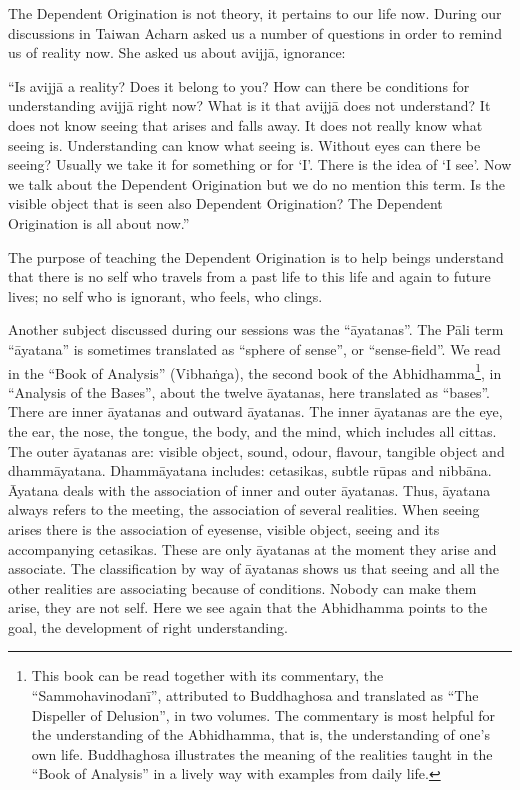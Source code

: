 \documentclass{book}
\begin{document}
The Dependent Origination is not theory, it
pertains to our life now. During our discussions in Taiwan Acharn asked
us a number of questions in order to remind us of reality now. She asked
us about avijjā, ignorance: 

``Is avijjā a reality? Does it belong to
you? How can there be conditions for understanding
avijjā right now? What is it that
avijjā does not understand? It does not know
seeing that arises and falls away. It does not really know what seeing
is. Understanding can know what seeing is. Without eyes can there be
seeing? Usually we take it for something or for `I'. There is the idea
of `I see'. Now we talk about the Dependent Origination but we do no
mention this term. Is the visible object that is seen also Dependent
Origination? The Dependent Origination is all about now.''

The purpose of teaching the Dependent
Origination is to help beings understand that there is no self who
travels from a past life to this life and again to future lives; no self
who is ignorant, who feels, who clings.

Another subject discussed during our
sessions was the ``āyatanas''. The
Pāli term
``āyatana'' is sometimes translated as
``sphere of
sense'', or ``sense-field''.
We read in the ``Book of Analysis''
(Vibhaṅga), the second book
of the Abhidhamma\footnote{This book can be read together with its
commentary, the
``Sammohavinodanī'',
attributed to Buddhaghosa and translated as
``The Dispeller of
Delusion'', in two volumes. The
commentary is most helpful for the understanding of the Abhidhamma, that
is, the understanding of one's own life.
Buddhaghosa illustrates the meaning of the realities taught in the
``Book of Analysis''
in a lively way with examples from daily
life. },
in ``Analysis of the
Bases'', about the twelve
āyatanas, here translated
as ``bases''. There are
inner āyatanas and outward
āyatanas. The inner
āyatanas are
the eye, the ear, the nose, the tongue,
the body, and the
mind, which includes all cittas. The outer
āyatanas are:
visible object, sound, odour, flavour,
tangible object and dhammāyatana.
Dhammāyatana includes: cetasikas,
subtle rūpas and nibbāna. Āyatana deals with the association
of inner and outer āyatanas. Thus, āyatana
always refers to the meeting, the association of several realities. When
seeing arises there is the association of eyesense, visible object,
seeing and its accompanying cetasikas. These are only āyatanas at the
moment they arise and associate. The
classification by way of āyatanas shows us that
seeing and all the other realities are associating because of
conditions. Nobody can make them arise, they are not self.
Here we see again that the Abhidhamma
points to the goal, the development of right understanding.
\end{document}
